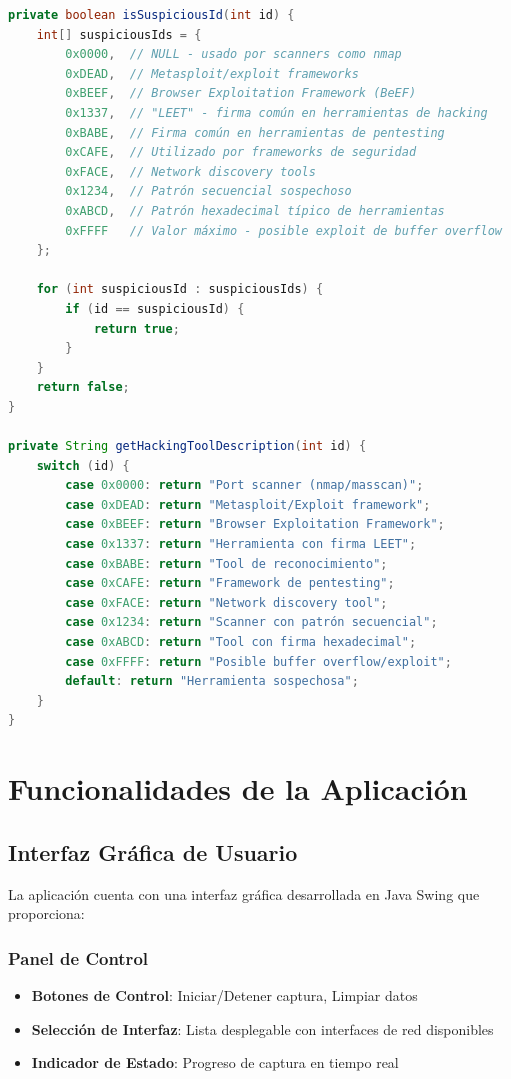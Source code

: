 \documentclass[12pt,a4paper]{article}
\begin{document}
\begin{lstlisting}[language=Java, caption=Detección de Patrones Sospechosos en Campo ID]
private boolean isSuspiciousId(int id) {
    int[] suspiciousIds = {
        0x0000,  // NULL - usado por scanners como nmap
        0xDEAD,  // Metasploit/exploit frameworks
        0xBEEF,  // Browser Exploitation Framework (BeEF)
        0x1337,  // "LEET" - firma común en herramientas de hacking
        0xBABE,  // Firma común en herramientas de pentesting
        0xCAFE,  // Utilizado por frameworks de seguridad
        0xFACE,  // Network discovery tools
        0x1234,  // Patrón secuencial sospechoso
        0xABCD,  // Patrón hexadecimal típico de herramientas
        0xFFFF   // Valor máximo - posible exploit de buffer overflow
    };
    
    for (int suspiciousId : suspiciousIds) {
        if (id == suspiciousId) {
            return true;
        }
    }
    return false;
}

private String getHackingToolDescription(int id) {
    switch (id) {
        case 0x0000: return "Port scanner (nmap/masscan)";
        case 0xDEAD: return "Metasploit/Exploit framework";
        case 0xBEEF: return "Browser Exploitation Framework";
        case 0x1337: return "Herramienta con firma LEET";
        case 0xBABE: return "Tool de reconocimiento";
        case 0xCAFE: return "Framework de pentesting";
        case 0xFACE: return "Network discovery tool";
        case 0x1234: return "Scanner con patrón secuencial";
        case 0xABCD: return "Tool con firma hexadecimal";
        case 0xFFFF: return "Posible buffer overflow/exploit";
        default: return "Herramienta sospechosa";
    }
}
\end{lstlisting}

\section{Funcionalidades de la Aplicación}

\subsection{Interfaz Gráfica de Usuario}

La aplicación cuenta con una interfaz gráfica desarrollada en Java Swing que proporciona:

\subsubsection{Panel de Control}
\begin{itemize}
    \item \textbf{Botones de Control}: Iniciar/Detener captura, Limpiar datos
    \item \textbf{Selección de Interfaz}: Lista desplegable con interfaces de red disponibles
    \item \textbf{Indicador de Estado}: Progreso de captura en tiempo real
\end{itemize}
\end{document}
